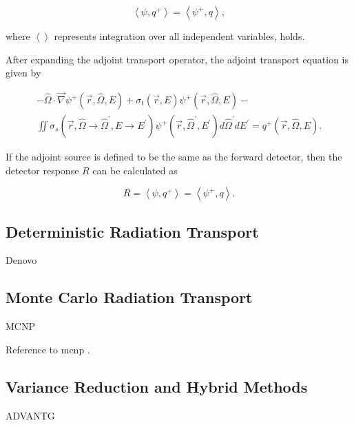 \begin{equation}\label{eq:bg:rt:adjoint-identity}
  \left<\psi,q^+\right> =
  \left<\psi^+,q\right>,
\end{equation}

where $\left<\right>$ represents integration over all independent variables, holds.

After expanding the adjoint transport operator, the adjoint transport equation is given by 

\begin{multline}\label{eq:bg:rt:adjoint-transport}
  -\hat{\Omega}\cdot\vec{\nabla}\psi^+\left(\vec{r},\hat{\Omega},E\right) +
  \sigma_t\left(\vec{r},E\right)\psi^+\left(\vec{r},\hat{\Omega},E\right) - \\
  \iint\sigma_s\left(\vec{r},\hat{\Omega}\rightarrow\hat{\Omega}^\prime,E\rightarrow E^\prime\right)\psi^+\left(\vec{r},\hat{\Omega}^\prime,E^\prime\right)d\hat{\Omega}^\prime dE^\prime =
  q^+\left(\vec{r},\hat{\Omega},E\right).
\end{multline}

If the adjoint source is defined to be the same as the forward detector, then the detector response $R$ can be calculated as

\begin{equation}\label{eq:bg:rt:detector-response}
  R =
  \left<\psi,q^+\right> =
  \left<\psi^+,q\right>.
\end{equation}

\subsection{Deterministic Radiation Transport}
\label{sec:bg:rt:determ}

Denovo

\subsection{Monte Carlo Radiation Transport}
\label{sec:bg:rt:mc}

MCNP

Reference to \ac{mcnp} \cite{mcnp5-theory}.

\subsection{Variance Reduction and Hybrid Methods}
\label{sec:bg:rt:vr}

ADVANTG
